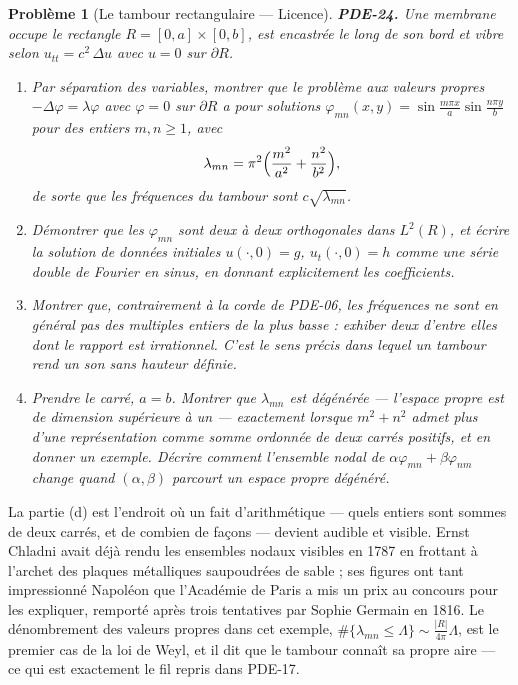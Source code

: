 \documentclass[11pt]{article}
\newtheorem{problem}{Problème}
\begin{document}
\begin{problem}[{Le tambour rectangulaire --- Licence}]
\textbf{PDE-24.} Une membrane occupe le rectangle
$R = [0,a]\times[0,b]$, est encastrée le long de son bord et vibre selon
$u_{tt} = c^2\,\Delta u$ avec $u = 0$ sur $\partial R$.
\begin{enumerate}
\item[(a)] Par séparation des variables, montrer que le problème aux valeurs propres
$-\Delta \varphi = \lambda\varphi$ avec $\varphi = 0$ sur $\partial R$ a pour
solutions $\varphi_{mn}(x,y) = \sin\frac{m\pi x}{a}\sin\frac{n\pi y}{b}$ pour des
entiers $m,n \ge 1$, avec
\[ \lambda_{mn} = \pi^2\Bigl(\frac{m^2}{a^2} + \frac{n^2}{b^2}\Bigr), \]
de sorte que les fréquences du tambour sont $c\sqrt{\lambda_{mn}}$.
\item[(b)] Démontrer que les $\varphi_{mn}$ sont deux à deux orthogonales dans $L^2(R)$, et
écrire la solution de données initiales $u(\cdot,0) = g$, $u_t(\cdot,0) = h$ comme une
série double de Fourier en sinus, en donnant explicitement les coefficients.
\item[(c)] Montrer que, contrairement à la corde de PDE-06, les fréquences ne sont en général pas des
multiples entiers de la plus basse : exhiber deux d'entre elles dont le rapport est irrationnel.
C'est le sens précis dans lequel un tambour rend un son sans hauteur définie.
\item[(d)] Prendre le carré, $a = b$. Montrer que $\lambda_{mn}$ est dégénérée --- l'espace propre
est de dimension supérieure à un --- exactement lorsque $m^2 + n^2$ admet plus
d'une représentation comme somme ordonnée de deux carrés positifs, et en donner un
exemple. Décrire comment l'ensemble nodal de $\alpha\varphi_{mn} + \beta\varphi_{nm}$
change quand $(\alpha,\beta)$ parcourt un espace propre dégénéré.
\end{enumerate}

\end{problem}

\noindent La partie (d) est l'endroit où un fait d'arithmétique --- quels entiers sont
sommes de deux carrés, et de combien de façons --- devient audible et visible.
Ernst Chladni avait déjà rendu les ensembles nodaux visibles en 1787 en frottant à l'archet des
plaques métalliques saupoudrées de sable ; ses figures ont tant impressionné Napoléon que
l'Académie de Paris a mis un prix au concours pour les expliquer, remporté après trois tentatives
par Sophie Germain en 1816. Le dénombrement des valeurs propres dans cet exemple,
$\#\{\lambda_{mn} \le \Lambda\} \sim \frac{|R|}{4\pi}\Lambda$, est le premier cas de la loi de
Weyl, et il dit que le tambour connaît sa propre aire --- ce qui est exactement le fil repris dans
PDE-17.
\end{document}
